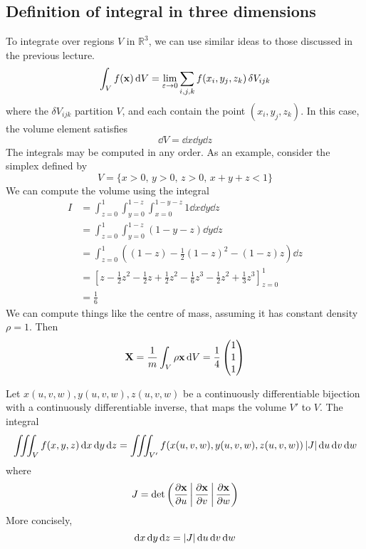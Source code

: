 \subsection{Definition of integral in three dimensions}
To integrate over regions \(V\) in \(\mathbb R^3\), we can use similar ideas to those discussed in the previous lecture.
\[
	\int_V f(\vb x) \dd{V} = \lim_{\varepsilon \to 0} \sum_{i,j,k} f(x_i, y_j, z_k) \,\delta V_{ijk}
\]
where the \(\delta V_{ijk}\) partition \(V\), and each contain the point \((x_i, y_j, z_k)\).
In this case, the volume element satisfies
\[
	\dd{V} = \dd{x}\dd{y}\dd{z}
\]
The integrals may be computed in any order.
As an example, consider the simplex defined by
\[
	V = \{ x > 0,\, y > 0,\, z > 0,\, x+y+z < 1 \}
\]
We can compute the volume using the integral
\begin{align*}
	I & = \int_{z=0}^1 \int_{y=0}^{1-z} \int_{x=0}^{1-y-z} 1 \dd{x}\dd{y}\dd{z}                                                        \\
	  & = \int_{z=0}^1 \int_{y=0}^{1-z} (1-y-z)\dd{y}\dd{z}                                                                            \\
	  & = \int_{z=0}^1 \left((1-z) - \frac{1}{2}(1-z)^2 - (1-z)z\right) \dd{z}                                                         \\
	  & = \left[ z - \frac{1}{2}z^2 - \frac{1}{2}z + \frac{1}{2}z^2 - \frac{1}{6}z^3 - \frac{1}{2}z^2 + \frac{1}{3}z^3 \right]_{z=0}^1 \\
	  & = \frac{1}{6}
\end{align*}
We can compute things like the centre of mass, assuming it has constant density \(\rho = 1\).
Then
\[
	\vb X = \frac{1}{m} \int_V \rho \vb x \dd{V} = \frac{1}{4}\begin{pmatrix}
		1 \\1\\1
	\end{pmatrix}
\]
\begin{proposition}
	Let \(x(u, v, w), y(u, v, w), z(u, v, w)\) be a continuously differentiable bijection with a continuously differentiable inverse, that maps the volume \(V'\) to \(V\).
	The integral
	\[
		\iiint_V f(x, y, z)\dd{x}\dd{y}\dd{z} = \iiint_{V'} f(x(u, v, w), y(u, v, w), z(u, v, w))\,\abs{J}\dd{u}\dd{v}\dd{w}
	\]
	where
	\[
		J = \det\left( \frac{\partial \vb x}{\partial u} \,\middle|\, \frac{\partial \vb x}{\partial v} \,\middle|\, \frac{\partial \vb x}{\partial w} \right)
	\]
	More concisely,
	\[
		\dd{x}\dd{y}\dd{z} = \abs{J}\dd{u}\dd{v}\dd{w}
	\]
\end{proposition}
